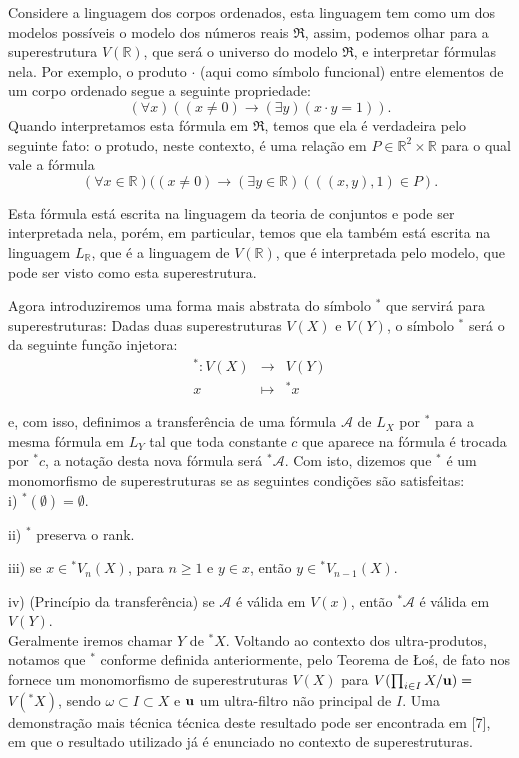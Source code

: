 \documentclass[12pt,a4paper]{article}
\theoremstyle{definition}
\begin{document}
Considere a linguagem dos corpos ordenados, esta linguagem tem como um dos modelos possíveis o modelo dos números reais $\mathfrak{R}$, assim, podemos olhar para a superestrutura $V(\mathbb{R})$, que será o universo do modelo $\mathfrak{R}$, e interpretar fórmulas nela. Por exemplo, o produto $\cdot$ (aqui como símbolo funcional) entre elementos de um corpo ordenado segue a seguinte propriedade: $$(\forall x) ((x\neq 0)\rightarrow (\exists y)(x\cdot y=1)).$$ Quando interpretamos esta fórmula em $\mathfrak{R}$, temos que ela é verdadeira pelo seguinte fato: o protudo, neste contexto, é uma relação em $P\in \mathbb{R}^2\times \mathbb{R}$ para o qual vale a fórmula $$(\forall x\in \mathbb{R})((x\neq 0)\rightarrow (\exists y\in \mathbb{R})(((x, y),1)\in P).$$

Esta fórmula está escrita na linguagem da teoria de conjuntos e pode ser interpretada nela, porém, em particular, temos que ela também está escrita na linguagem $L_{\mathbb{R}}$, que é a linguagem de $V(\mathbb{R})$, que é interpretada pelo modelo, que pode ser visto como esta superestrutura. 

Agora introduziremos uma forma mais abstrata do símbolo $^*$ que servirá para superestruturas: Dadas duas superestruturas $V(X)$ e $V(Y)$, o símbolo $^*$ será o da seguinte função injetora:  
$$\begin{array}{rcl}
     {^*}:V(X)&\longrightarrow & V(Y) \\
     x& \longmapsto & {^*x}
\end{array}$$

e, com isso, definimos a transferência de uma fórmula $\mathscr{A}$ de $L_X$ por $^*$ para a mesma fórmula em $L_Y$ tal que toda constante $c$ que aparece na fórmula é trocada por $^{*}c$, a notação desta nova fórmula será $^{*}\mathscr{A}$. Com isto, dizemos que $^*$ é um monomorfismo de superestruturas se as seguintes condições são satisfeitas: \\

i) $^*(\emptyset)=\emptyset$. 

ii) $^*$ preserva o rank.  

iii) se $x\in {^* V_n(X)}$, para $n\geq 1$ e $y\in x$, então $y\in {^* V_{n-1}(X)}$.  

iv) (Princípio da transferência) se $\mathscr{A}$ é válida em $V(x)$, então  $^{*}\mathscr{A}$ é válida em $V(Y)$. \\

Geralmente iremos chamar $Y$ de $^*X$. Voltando ao contexto dos ultra-produtos, notamos que $^*$ conforme definida anteriormente, pelo Teorema de Łoś, de fato nos fornece um monomorfismo de superestruturas $V(X)$ para $V(\prod_{i\in I} X / \bf{u}) =$ $V({^*X})$, sendo $\omega \subset I\subset X$ e $\bf{u}$ um ultra-filtro não principal de $I$. Uma demonstração mais técnica técnica deste resultado pode ser encontrada em [7], em que o resultado utilizado já é enunciado no contexto de superestruturas. 
\end{document}

